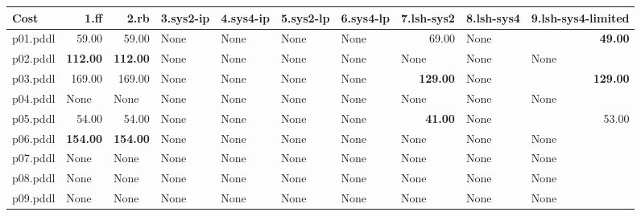 \documentclass{article}
\begin{document}
\begin{tabular}{@{}lrrrrrrrrr@{}}
Cost & 1.ff & 2.rb & 3.sys2-ip & 4.sys4-ip & 5.sys2-lp & 6.sys4-lp & 7.lsh-sys2 & 8.lsh-sys4 & 9.lsh-sys4-limited \\
\midrule
p01.pddl & 59.00 & 59.00 & \multicolumn{1}{|l|}{None} & \multicolumn{1}{|l|}{None} & \multicolumn{1}{|l|}{None} & \multicolumn{1}{|l|}{None} & 69.00 & \multicolumn{1}{|l|}{None} & \textbf{49.00} \\
p02.pddl & \textbf{112.00} & \textbf{112.00} & \multicolumn{1}{|l|}{None} & \multicolumn{1}{|l|}{None} & \multicolumn{1}{|l|}{None} & \multicolumn{1}{|l|}{None} & \multicolumn{1}{|l|}{None} & \multicolumn{1}{|l|}{None} & \multicolumn{1}{|l|}{None} \\
p03.pddl & 169.00 & 169.00 & \multicolumn{1}{|l|}{None} & \multicolumn{1}{|l|}{None} & \multicolumn{1}{|l|}{None} & \multicolumn{1}{|l|}{None} & \textbf{129.00} & \multicolumn{1}{|l|}{None} & \textbf{129.00} \\
p04.pddl & \multicolumn{1}{|l|}{None} & \multicolumn{1}{|l|}{None} & \multicolumn{1}{|l|}{None} & \multicolumn{1}{|l|}{None} & \multicolumn{1}{|l|}{None} & \multicolumn{1}{|l|}{None} & \multicolumn{1}{|l|}{None} & \multicolumn{1}{|l|}{None} & \multicolumn{1}{|l|}{None} \\
p05.pddl & 54.00 & 54.00 & \multicolumn{1}{|l|}{None} & \multicolumn{1}{|l|}{None} & \multicolumn{1}{|l|}{None} & \multicolumn{1}{|l|}{None} & \textbf{41.00} & \multicolumn{1}{|l|}{None} & 53.00 \\
p06.pddl & \textbf{154.00} & \textbf{154.00} & \multicolumn{1}{|l|}{None} & \multicolumn{1}{|l|}{None} & \multicolumn{1}{|l|}{None} & \multicolumn{1}{|l|}{None} & \multicolumn{1}{|l|}{None} & \multicolumn{1}{|l|}{None} & \multicolumn{1}{|l|}{None} \\
p07.pddl & \multicolumn{1}{|l|}{None} & \multicolumn{1}{|l|}{None} & \multicolumn{1}{|l|}{None} & \multicolumn{1}{|l|}{None} & \multicolumn{1}{|l|}{None} & \multicolumn{1}{|l|}{None} & \multicolumn{1}{|l|}{None} & \multicolumn{1}{|l|}{None} & \multicolumn{1}{|l|}{None} \\
p08.pddl & \multicolumn{1}{|l|}{None} & \multicolumn{1}{|l|}{None} & \multicolumn{1}{|l|}{None} & \multicolumn{1}{|l|}{None} & \multicolumn{1}{|l|}{None} & \multicolumn{1}{|l|}{None} & \multicolumn{1}{|l|}{None} & \multicolumn{1}{|l|}{None} & \multicolumn{1}{|l|}{None} \\
p09.pddl & \multicolumn{1}{|l|}{None} & \multicolumn{1}{|l|}{None} & \multicolumn{1}{|l|}{None} & \multicolumn{1}{|l|}{None} & \multicolumn{1}{|l|}{None} & \multicolumn{1}{|l|}{None} & \multicolumn{1}{|l|}{None} & \multicolumn{1}{|l|}{None} & \multicolumn{1}{|l|}{None} \\

\end{tabular}
\end{document}
